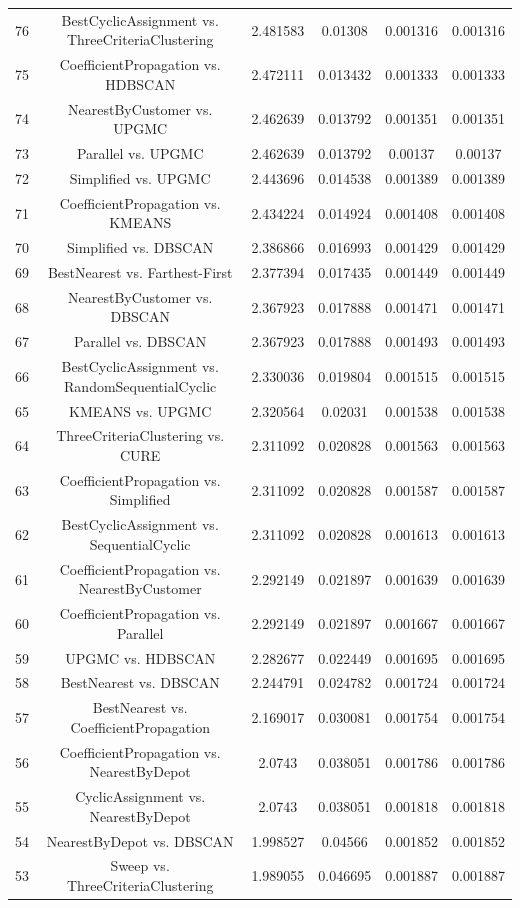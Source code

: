 \documentclass[a4paper,10pt]{article}
\begin{document}
\begin{landscape}
\begin{table}[!htp]
\begin{tabular}{cccccc}
76&BestCyclicAssignment vs. ThreeCriteriaClustering&2.481583&0.01308&0.001316&0.001316\\
75&CoefficientPropagation vs. HDBSCAN&2.472111&0.013432&0.001333&0.001333\\
74&NearestByCustomer vs. UPGMC&2.462639&0.013792&0.001351&0.001351\\
73&Parallel vs. UPGMC&2.462639&0.013792&0.00137&0.00137\\
72&Simplified vs. UPGMC&2.443696&0.014538&0.001389&0.001389\\
71&CoefficientPropagation vs. KMEANS&2.434224&0.014924&0.001408&0.001408\\
70&Simplified vs. DBSCAN&2.386866&0.016993&0.001429&0.001429\\
69&BestNearest vs. Farthest-First&2.377394&0.017435&0.001449&0.001449\\
68&NearestByCustomer vs. DBSCAN&2.367923&0.017888&0.001471&0.001471\\
67&Parallel vs. DBSCAN&2.367923&0.017888&0.001493&0.001493\\
66&BestCyclicAssignment vs. RandomSequentialCyclic&2.330036&0.019804&0.001515&0.001515\\
65&KMEANS vs. UPGMC&2.320564&0.02031&0.001538&0.001538\\
64&ThreeCriteriaClustering vs. CURE&2.311092&0.020828&0.001563&0.001563\\
63&CoefficientPropagation vs. Simplified&2.311092&0.020828&0.001587&0.001587\\
62&BestCyclicAssignment vs. SequentialCyclic&2.311092&0.020828&0.001613&0.001613\\
61&CoefficientPropagation vs. NearestByCustomer&2.292149&0.021897&0.001639&0.001639\\
60&CoefficientPropagation vs. Parallel&2.292149&0.021897&0.001667&0.001667\\
59&UPGMC vs. HDBSCAN&2.282677&0.022449&0.001695&0.001695\\
58&BestNearest vs. DBSCAN&2.244791&0.024782&0.001724&0.001724\\
57&BestNearest vs. CoefficientPropagation&2.169017&0.030081&0.001754&0.001754\\
56&CoefficientPropagation vs. NearestByDepot&2.0743&0.038051&0.001786&0.001786\\
55&CyclicAssignment vs. NearestByDepot&2.0743&0.038051&0.001818&0.001818\\
54&NearestByDepot vs. DBSCAN&1.998527&0.04566&0.001852&0.001852\\
53&Sweep vs. ThreeCriteriaClustering&1.989055&0.046695&0.001887&0.001887\\

\end{tabular}
\end{table}
\end{landscape}
\end{document}
